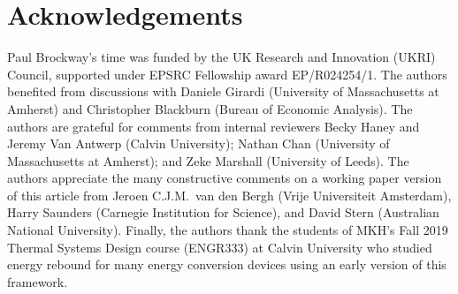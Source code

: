 \documentclass[12pt]{article}\usepackage[]{graphicx}\usepackage[]{xcolor}
\begin{document}
\section*{Acknowledgements}
\label{sec:acknowledgements}




Paul Brockway’s time was funded by the UK Research and Innovation (UKRI) 
Council, supported under EPSRC Fellowship award EP/R024254/1.
The authors benefited from discussions with 
Daniele Girardi (University of Massachusetts at Amherst) and 
Christopher Blackburn (Bureau of Economic Analysis).
The authors are grateful for comments from internal reviewers
Becky Haney and Jeremy Van Antwerp (Calvin University); 
Nathan Chan (University of Massachusetts at Amherst); and 
Zeke Marshall (University of Leeds).
The authors appreciate the many constructive comments 
on a working paper version of this article from 
Jeroen C.J.M.\ van den Bergh (Vrije Universiteit Amsterdam),
Harry Saunders (Carnegie Institution for Science), and
David Stern (Australian National University).
Finally, the authors thank the students of MKH's Fall 2019 
Thermal Systems Design course (ENGR333) at Calvin University
who studied energy rebound for many energy conversion devices
using an early version of this framework.

\end{document}
